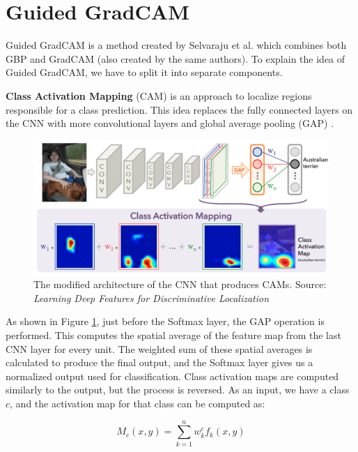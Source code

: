 \section{Guided GradCAM}

Guided GradCAM is a method created by Selvaraju et al. \cite{selvaraju2017grad} which combines both GBP and GradCAM (also created by the same authors). To explain the idea of Guided GradCAM, we have to split it into separate components.

\vspace{\baselineskip}

\textbf{Class Activation Mapping} (CAM) \cite{zhou2016learning} is an approach to localize regions responsible for a class prediction. This idea replaces the fully connected layers on the CNN with more convolutional layers and global average pooling (GAP) \cite{lin2013network}. 

\begin{figure}[h]
    \centering
    \includegraphics[width=\textwidth]{methods/images/cam-structure.png}
 \caption{The modified architecture of the CNN that produces CAMs. Source: \textit{Learning Deep Features for Discriminative Localization} \cite{lin2013network} }\label{fig:gradcam-cam}
\end{figure}

As shown in Figure \ref{fig:gradcam-cam}, just before the Softmax layer, the GAP operation is performed. This computes the spatial average of the feature map from the last CNN layer for every unit. The weighted sum of these spatial averages is calculated to produce the final output, and the Softmax layer gives us a normalized output used for classification. Class activation maps are computed similarly to the output, but the process is reversed. As an input, we have a class $c$, and the activation map for that class can be computed as:

\begin{equation}
    M_c(x,y) = \sum_{k=1}^{n} w_k^c f_k(x,y)
    \label{eq:cam-activation}
\end{equation}

